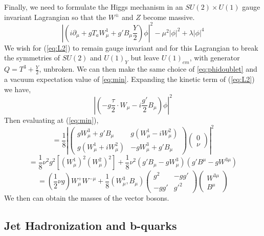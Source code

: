 Finally, we need to formulate the Higgs mechanism in an $SU(2)\times U(1)$ 
gauge invariant Lagrangian so that the $W^{\pm}$ and $Z$ become massive. 
\begin{equation} %
\left| \left( i\partial_{\mu}+gT_{a}W_{\mu}^{1}+g'B_{\mu}\frac{Y}{2}\right)\phi \right|^{2} - \mu^{2}\left| \phi \right| ^{2}
+\lambda\left| \phi \right| ^{4}
\label{eq:L2}
\end{equation}
We wish for (\ref{eq:L2}) to remain gauge invariant and 
for this Lagrangian to break the symmetries of $SU(2)$ and $U(1)_{Y}$
but leave $U(1)_{em}$, with generator $Q=T^{3}+\frac{Y}{2}$, unbroken. 
We can then make the same choice of \ref{eq:phidoublet} and a vacuum 
expectation value of \ref{eq:min}.
Expanding the kinetic term of (\ref{eq:L2}) we have,
\begin{equation}
\left| \left(-g\frac{\tau}{2}\cdot W_{\mu}-i\frac{g'}{2}B_{\mu}\right)\phi\right|^{2}
\end{equation}
Then evaluating at (\ref{eq:min}),
\begin{equation}
=\frac{1}{8}\left|
\begin{pmatrix}
		gW_{\mu}^{3}+g'B_{\mu} & g(W_{\mu}^{1}-iW_{\mu}^{2})\\
		g(W_{\mu}^{1}+iW_{\mu}^{2}) & -gW_{\mu}^{3}+g'B_{\mu}
\end{pmatrix}
\begin{pmatrix}
0\\
\nu
\end{pmatrix}
\right|^{2}
\end{equation}
\begin{equation}
=
\frac{1}{8}\nu^{2}g^{2}\left[\left(W_{\mu}^{1} \right)^{2} \left(W_{\mu}^{2} \right)^{2} \right]
+\frac{1}{8}\nu^{2}(g'B_{\mu}-gW_{\mu}^{3})(g'B^{\mu}-gW^{3\mu}) 
\end{equation}
\begin{equation}
=(\frac{1}{2}\nu g)W_{\mu}^{+}W^{-\mu}+\frac{1}{8}(W_{\mu}^{3},B_{\mu})
\begin{pmatrix}
g^{2} & -gg'\\
-gg'  & g'^{2}
\end{pmatrix}
\begin{pmatrix}
W^{3\mu}\\
B^{\mu}
\end{pmatrix}
\end{equation}
We then can obtain the masses of the vector bosons.


\subsection{Jet Hadronization and b-quarks}%
